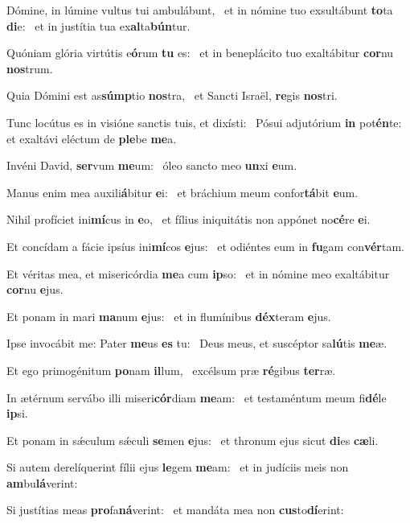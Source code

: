\item Dómine, in lúmine vultus tui ambulábunt,~\pscross{} et in nómine tuo exsultábunt \textbf{to}ta \textbf{di}e:~\psstar{} et in justítia tua ex\textbf{al}ta\textbf{bún}tur.
\item Quóniam glória virtútis e\textbf{ó}rum \textbf{tu} es:~\psstar{} et in beneplácito tuo exaltábitur \textbf{cor}nu \textbf{nos}trum.
\item Quia Dómini est as\textbf{súmp}tio \textbf{nos}tra,~\psstar{} et Sancti Israël, \textbf{re}gis \textbf{nos}tri.
\item Tunc locútus es in visióne sanctis tuis, et dixísti:~\pscross{} Pósui adjutórium \textbf{in} pot\textbf{én}te:~\psstar{} et exaltávi eléctum de \textbf{ple}be \textbf{me}a.
\item Invéni David, \textbf{ser}vum \textbf{me}um:~\psstar{} óleo sancto meo \textbf{un}xi \textbf{e}um.
\item Manus enim mea auxili\textbf{á}bitur \textbf{e}i:~\psstar{} et bráchium meum confor\textbf{tá}bit \textbf{e}um.
\item Nihil profíciet ini\textbf{mí}cus in \textbf{e}o,~\psstar{} et fílius iniquitátis non appónet no\textbf{cé}re \textbf{e}i.
\item Et concídam a fácie ipsíus ini\textbf{mí}cos \textbf{e}jus:~\psstar{} et odiéntes eum in \textbf{fu}gam con\textbf{vér}tam.
\item Et véritas mea, et misericórdia \textbf{me}a cum \textbf{ip}so:~\psstar{} et in nómine meo exaltábitur \textbf{cor}nu \textbf{e}jus.
\item Et ponam in mari \textbf{ma}num \textbf{e}jus:~\psstar{} et in flumínibus \textbf{déx}teram \textbf{e}jus.
\item Ipse invocábit me: Pater \textbf{me}us \textbf{es} tu:~\psstar{} Deus meus, et suscéptor sa\textbf{lú}tis \textbf{me}æ.
\item Et ego primogénitum \textbf{po}nam \textbf{il}lum,~\psstar{} excélsum præ \textbf{ré}gibus \textbf{ter}ræ.
\item In ætérnum servábo illi miseri\textbf{cór}diam \textbf{me}am:~\psstar{} et testaméntum meum fi\textbf{dé}le \textbf{ip}si.
\item Et ponam in sǽculum sǽculi \textbf{se}men \textbf{e}jus:~\psstar{} et thronum ejus sicut \textbf{di}es \textbf{cæ}li.
\item Si autem derelíquerint fílii ejus \textbf{le}gem \textbf{me}am:~\psstar{} et in judíciis meis non \textbf{am}bu\textbf{lá}verint:
\item Si justítias meas \textbf{pro}fa\textbf{ná}ve\-rint:~\psstar{} et mandáta mea non \textbf{cus}to\textbf{dí}erint:
